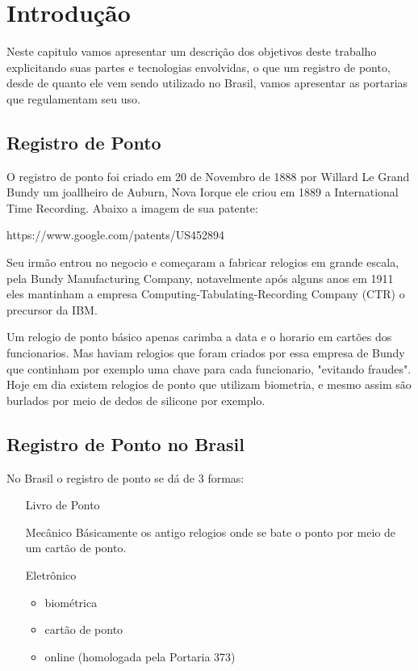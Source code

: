 \documentclass[12pt,openright,twoside,a4paper,english, brazil]{abntex2} %
\begin{document}
\listoffigures*
\cleardoublepage %
\listoftables* %
\cleardoublepage
\printterms[columns=1,style=align] %
\cleardoublepage %
\tableofcontents








\chapter{Introdução}

Neste capitulo vamos apresentar um descrição dos objetivos deste trabalho explicitando suas partes e tecnologias envolvidas, o que um registro de ponto, desde de quanto ele vem sendo utilizado no Brasil, vamos apresentar as portarias que regulamentam seu uso.

\section{Registro de Ponto}

O registro de ponto foi criado em 20 de Novembro de 1888 por Willard Le Grand Bundy um joallheiro de Auburn, Nova Iorque ele criou em 1889 a International Time Recording. Abaixo a imagem de sua patente:

https://www.google.com/patents/US452894

Seu irmão entrou no negocio e começaram a fabricar relogios em grande escala, pela Bundy Manufacturing Company, notavelmente após alguns anos em 1911 eles mantinham a empresa Computing-Tabulating-Recording Company (CTR) o precursor da IBM.

Um relogio de ponto básico apenas carimba a data e o horario em cartões dos funcionarios. Mas haviam relogios que foram criados por essa empresa de Bundy que continham por exemplo uma chave para cada funcionario, "evitando fraudes". Hoje em dia existem relogios de ponto que utilizam biometria, e mesmo assim são burlados por meio de dedos de silicone por exemplo.

\section{Registro de Ponto no Brasil}

No Brasil o registro de ponto se dá de 3 formas:

\begin{itemize}
 \item [Livro de Ponto] 
 \item [Mecânico] Básicamente os antigo relogios onde se bate o ponto por meio de um cartão de ponto.
 \item [Eletrônico] \begin{itemize} 
 										 \item biométrica
 										 \item cartão de ponto
 										 \item online (homologada pela Portaria 373)
                    \end{itemize}
\end{itemize}
\end{document}
